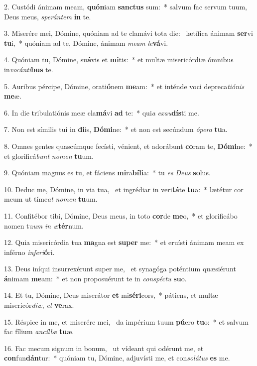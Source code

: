 2. Custódi ánimam meam, \textbf{quón}iam \textbf{sanc}\textbf{tus} sum:~*  salvum fac servum tuum, Deus meus, \textit{spe}\textit{rán}\textit{tem} \textbf{in} te.\

3. Miserére mei, Dómine, quóniam ad te clamávi tota die: \dag\  lætífica ánimam \textbf{ser}vi \textbf{tu}i,~*  quóniam ad te, Dómine, ánimam \textit{me}\textit{am} \textit{le}\textbf{vá}vi.\

4. Quóniam tu, Dómine, su\textbf{á}vis et \textbf{mi}tis:~*  et multæ misericórdiæ ómnibus in\textit{vo}\textit{cán}\textit{ti}\textbf{bus} te.\

5. Auribus pércipe, Dómine, orati\textbf{ó}nem \textbf{me}am:~*  et inténde voci depreca\textit{ti}\textit{ó}\textit{nis} \textbf{me}æ.\

6. In die tribulatiónis meæ cla\textbf{má}vi \textbf{ad} te:~*  qui\textit{a} \textit{ex}\textit{au}\textbf{dís}ti me.\

7. Non est símilis tui in \textbf{di}is, \textbf{Dó}\textbf{mi}ne:~*  et non est secúndum \textit{ó}\textit{pe}\textit{ra} \textbf{tu}a.\

8. Omnes gentes quascúmque fecísti, vénient, et adorábunt \textbf{co}ram te, \textbf{Dó}\textbf{mi}ne:~*  et glorificá\textit{bunt} \textit{no}\textit{men} \textbf{tu}um.\

9. Quóniam magnus es tu, et fáciens \textbf{mi}ra\textbf{bí}\textbf{li}a:~*  tu \textit{es} \textit{De}\textit{us} \textbf{so}lus.\

10. Deduc me, Dómine, in via tua, \dag\  et ingrédiar in veri\textbf{tá}te \textbf{tu}a:~*  lætétur cor meum ut tíme\textit{at} \textit{no}\textit{men} \textbf{tu}um.\

11. Confitébor tibi, Dómine, Deus meus, in toto \textbf{cor}de \textbf{me}o,~*  et glorificábo nomen tu\textit{um} \textit{in} \textit{æ}\textbf{tér}num.\

12. Quia misericórdia tua \textbf{ma}gna est \textbf{su}\textbf{per} me:~*  et eruísti ánimam meam ex inférno \textit{in}\textit{fe}\textit{ri}\textbf{ó}ri.\

13. Deus iníqui insurrexérunt super me, \dag\  et synagóga poténtium quæsiérunt \textbf{á}nimam \textbf{me}am:~*  et non proposuérunt te in \textit{con}\textit{spéc}\textit{tu} \textbf{su}o.\

14. Et tu, Dómine, Deus miserátor \textbf{et} mi\textbf{sé}\textbf{ri}cors,~*  pátiens, et multæ misericór\textit{di}\textit{æ}, \textit{et} \textbf{ve}rax.\

15. Réspice in me, et miserére mei, \dag\  da impérium tuum \textbf{pú}ero \textbf{tu}o:~*  et salvum fac fílium \textit{an}\textit{cíl}\textit{læ} \textbf{tu}æ.\

16. Fac mecum signum in bonum, \dag\  ut vídeant qui odérunt me, et \textbf{con}fun\textbf{dán}tur:~*  quóniam tu, Dómine, adjuvísti me, et con\textit{so}\textit{lá}\textit{tus} \textbf{es} me.\

